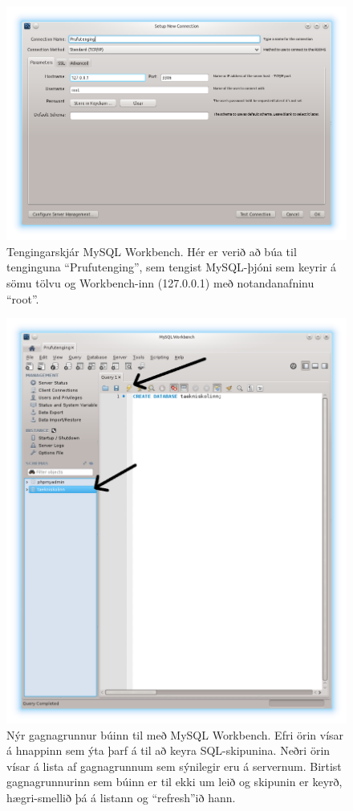 \begin{figure}
\caption[Tengingarskjár MySQL Workbench]{Tengingarskjár MySQL Workbench. Hér er verið að búa til tenginguna ``Prufutenging'', sem tengist MySQL-þjóni sem keyrir á sömu tölvu og Workbench-inn (127.0.0.1) með notandanafninu ``root''.}
\label{mynd:workbench-login}
\centering
\includegraphics[width=\linewidth]{myndir/workbench-login}
\end{figure}

\begin{figure}
\caption[Nýr gagnagrunnur]{Nýr gagnagrunnur búinn til með MySQL Workbench. Efri örin vísar á hnappinn sem ýta þarf á til að keyra SQL-skipunina. Neðri örin vísar á lista af gagnagrunnum sem sýnilegir eru á servernum. Birtist gagnagrunnurinn sem búinn er til ekki um leið og skipunin er keyrð, hægri-smellið þá á listann og ``refresh''ið hann.}
\label{mynd:workbench-create-db}
\centering
\includegraphics[width=0.8\linewidth]{myndir/workbench-create-db}
\end{figure}

